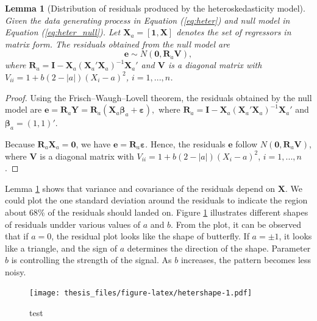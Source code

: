 \documentclass{monashthesis}
\newtheorem{lemma}{Lemma}[chapter]
\theoremstyle{definition}
\theoremstyle{definition}
\theoremstyle{definition}
\theoremstyle{definition}
\theoremstyle{remark}
\begin{document}
\begin{lemma}[Distribution of residuals produced by the heteroskedasticity model] \label{lemma:heter}
Given the data generating process in Equation (\ref{eq:heter}) and null model in Equation (\ref{eq:heter_null}). Let $\boldsymbol{X}_a=[\boldsymbol{1},\boldsymbol{X}]$ denotes the set of regressors in matrix form. The residuals obtained from the null model are $$\boldsymbol{e} \sim N(\boldsymbol{0}, \boldsymbol{R}_a\boldsymbol{V}),$$ where $\boldsymbol{R}_a=\boldsymbol{I}-\boldsymbol{X}_a(\boldsymbol{X}_a'\boldsymbol{X}_a)^{-1}\boldsymbol{X}_a'$ and $\boldsymbol{V}$ is a diagonal matrix with $V_{ii}=1+b(2-|a|)(X_i  -  a)^2$, $i = 1,...,n$. 
\end{lemma}

\begin{proof}
Using the Frisch–Waugh–Lovell theorem, the residuals obtained by the null model are $\boldsymbol{e}=\boldsymbol{R}_a\boldsymbol{Y}=\boldsymbol{R}_a(\boldsymbol{X}_a\boldsymbol{\beta}_a+\boldsymbol{\varepsilon}),$ where $\boldsymbol{R}_a=\boldsymbol{I}-\boldsymbol{X}_a(\boldsymbol{X}_a'\boldsymbol{X}_a)^{-1}\boldsymbol{X}_a'$ and $\boldsymbol{\beta}_a=(1,1)'$.

Because $\boldsymbol{R}_a\boldsymbol{X}_a=\boldsymbol{0}$, we have $\boldsymbol{e}=\boldsymbol{R}_a\boldsymbol{\varepsilon}$. Hence, the residuals $\boldsymbol{e}$ follow $N(\boldsymbol{0}, \boldsymbol{R}_a\boldsymbol{V})$, where $\boldsymbol{V}$ is a diagonal matrix with $V_{ii}=1+b(2-|a|)(X_i  -  a)^2$, $i = 1,...,n$. 
\end{proof}

Lemma \ref{lemma:heter} shows that variance and covariance of the residuals depend on \(\boldsymbol{X}\). We could plot the one standard deviation around the residuals to indicate the region about 68\% of the residuals should landed on. Figure \ref{fig:hetershape} illustrates different shapes of residuals undder various values of \(a\) and \(b\). From the plot, it can be observed that if \(a = 0\), the residual plot looks like the shape of butterfly. If \(a = \pm 1\), it looks like a triangle, and the sign of \(a\) determines the direction of the shape. Parameter \(b\) is controlling the strength of the signal. As \(b\) increases, the pattern becomes less noisy.

\begin{figure}
\centering
\texttt{[image: thesis\_files/figure-latex/hetershape-1.pdf]}
\caption{\label{fig:hetershape}test}
\end{figure}
\end{document}
